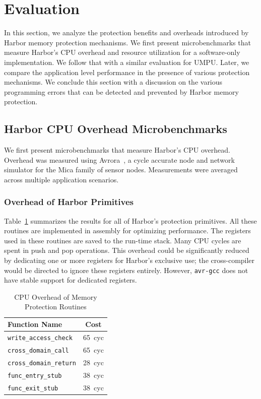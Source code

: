 \section{Evaluation}
\label{sec:eval} 
%
In this section, we analyze the protection benefits and overheads
introduced by Harbor memory protection mechanisms.
%
We first present microbenchmarks that measure Harbor's CPU overhead
and resource utilization for a software-only implementation.
%
We follow that with a similar evaluation for UMPU.
%
Later, we compare the application level performance in the presence of
various protection mechanisms.
%
We conclude this section with a discussion on the various programming
errors that can be detected and prevented by Harbor memory protection.
%
\subsection{Harbor CPU Overhead Microbenchmarks}
%
We first present microbenchmarks that measure Harbor's CPU overhead.
%
Overhead was measured using Avrora~\cite{titzer05avrora}, a cycle
accurate node and network simulator for the Mica family of sensor
nodes.
%
Measurements were averaged across multiple application scenarios.
%
\subsubsection{Overhead of Harbor Primitives}
%
Table~\ref{tab:harbor_routines} summarizes the results for all of Harbor's
protection primitives.
%
All these routines are implemented in assembly for optimizing performance.
%
The registers used in these routines are saved to the run-time stack.
%
Many CPU cycles are spent in push and pop operations.
%
This overhead could be significantly reduced by dedicating one or more
registers for Harbor's exclusive use; the cross-compiler would be directed
to ignore these registers entirely.
%
%
However, \texttt{avr-gcc} does not have stable support for dedicated registers.
%

\begin{table}[htdp]
\centering
\small{
\begin{tabular}{|l|c|}
	\hline
	Function Name & Cost\\
	\hline
	\texttt{write\_access\_check} & 65~cyc\\
	\texttt{cross\_domain\_call} & 65~cyc\\
	\texttt{cross\_domain\_return} & 28~cyc\\
	\texttt{func\_entry\_stub} & 38~cyc\\
	\texttt{func\_exit\_stub} & 38~cyc\\
	\hline
\end{tabular}}
\caption{CPU Overhead of Memory Protection Routines}
\label{tab:harbor_routines}
\end{table}

